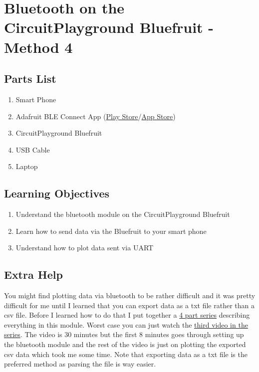 \newpage

\section{Bluetooth on the CircuitPlayground Bluefruit - Method 4}
\label{s:Bluetooth}

\subsection{Parts List}

\begin{enumerate}[itemsep=-5pt]
\item Smart Phone
\item Adafruit BLE Connect App (\href{https://play.google.com/store/apps/details?id=com.adafruit.bluefruit.le.connect}{Play Store}/\href{https://apps.apple.com/us/app/bluefruit-connect/id830125974}{App Store})
\item CircuitPlayground Bluefruit
\item USB Cable
\item Laptop
\end{enumerate}

\subsection{Learning Objectives}
\begin{enumerate}[itemsep=-5pt]
\item Understand the bluetooth module on the CircuitPlayground Bluefruit
\item Learn how to send data via the Bluefruit to your smart phone
\item Understand how to plot data sent via UART
\end{enumerate}

\subsection{Extra Help}

You might find plotting data via bluetooth to be rather difficult and
it was pretty difficult for me until I learned that you can export
data as a txt file rather than a csv file. Before I learned how to do
that I put together
a \href{https://www.youtube.com/playlist?list=PL_D7_GvGz-v0-U3JACRMgldvqQqn2mje9}{4
part series} describing everything in this module. Worst case you can
just watch
the \href{https://www.youtube.com/watch?v=9EHNFdVX9O8&list=PL_D7_GvGz-v0-U3JACRMgldvqQqn2mje9&index=3}{third
video in the series}. The video is 30 minutes but the first 8 minutes
goes through setting up the bluetooth module and the rest of the video
is just on plotting the exported csv data which took me some
time. Note that exporting data as a txt file is the preferred method
as parsing the file is way easier.

